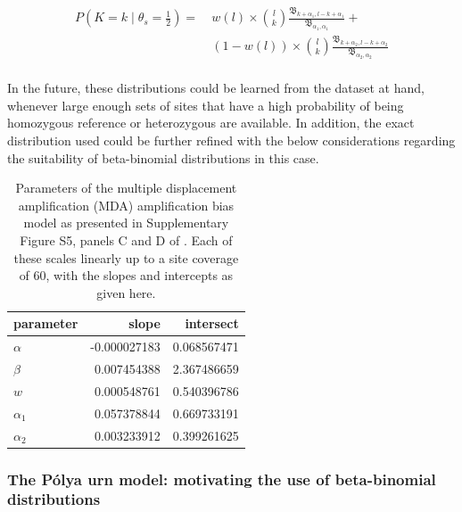 \documentclass[authoryear,preprint,11pt]{scrartcl}
\newcommand{\Prob}{{P}}
\begin{document}
\begin{equation}
 \label{eq.beta-binomial}
 \begin{split}
  \Prob(K = k \mid \theta_s = \frac{1}{2}) =~ &w(l) \times {l \choose k} \frac{ \mathfrak{B}_{k+\alpha_1,l-k+\alpha_1} }{ \mathfrak{B}_{\alpha_1,\alpha_1} } +\\
  &(1-w(l)) \times {l \choose k} \frac{ \mathfrak{B}_{k+\alpha_2,l-k+\alpha_2} }{ \mathfrak{B}_{\alpha_2,\alpha_2} }\\
 \end{split}
\end{equation}

In the future, these distributions could be learned from the dataset at hand, whenever large enough sets of sites that have a high probability of being homozygous reference or heterozygous are available.
In addition, the exact distribution used could be further refined with the below considerations regarding the suitability of beta-binomial distributions in this case.\\

\begin{table}[tbp]
 \caption{Parameters of the multiple displacement amplification (MDA) amplification bias model as presented in Supplementary Figure S5, panels C and D of \cite{lodato_somatic_2015}. Each of these scales linearly up to a site coverage of 60, with the slopes and intercepts as given here.}
 \label{tab:Lodato}
 \renewcommand{\arraystretch}{1.15}

 \begin{center}
  \begin{tabular}{lrr}
   parameter  & slope        & intersect   \\
   \toprule
   $\alpha$   & -0.000027183 & 0.068567471 \\
   $\beta$    & 0.007454388  & 2.367486659 \\
   \midrule
   $w$        & 0.000548761  & 0.540396786 \\
   $\alpha_1$ & 0.057378844  & 0.669733191 \\
   $\alpha_2$ & 0.003233912  & 0.399261625 \\
   \bottomrule
  \end{tabular}
 \end{center}
\end{table}

\subsubsection{The Pólya urn model: motivating the use of beta-binomial distributions}\label{sec:polya-urn}
\end{document}

